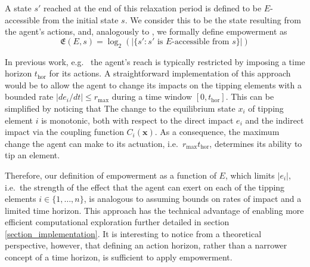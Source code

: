 \documentclass[conference]{IEEEtran}
\newcommand{\vectorsym}[1]{\ensuremath{\mathbf{#1}}}
\newcommand{\agentimpact}{\ensuremath{e}}
\newcommand{\empowerment}{\ensuremath{\mathfrak{E}}}
\newcommand{\couplingfunction}{\ensuremath{C}}
\newcommand{\impactstrength}{\ensuremath{E}}
\newcommand{\timehorizon}{\ensuremath{t_{\mathrm{hor}}}}
\begin{document}
A state $s'$ reached at the end of this relaxation period is defined
to be $\impactstrength$-accessible from the initial state $s$. We
consider this to be the state resulting from the agent's actions, and,
analogously to \cite[eq.~(2)]{Kim2009_sustainability}, we formally define
empowerment as
\begin{equation}
  \label{eq_empowerment}
  \empowerment(\impactstrength, s) =
  \log_2(|\{s': s' \mbox{ is } \impactstrength\mbox{-accessible from } s\}|)
\end{equation}

In previous work, e.g.\ \cite{Salge2014_empowermentintro} the agent's
reach is typically restricted by imposing a time horizon
$\timehorizon$ for its actions. A straightforward implementation of
this approach would be to allow the agent to change its impacts on the
tipping elements with a bounded rate
$|d\agentimpact_i / dt| \le r_{\mathrm{max}}$ during a time window
$[0, \timehorizon]$. This can be simplified by noticing that The
change to the equilibrium state $x_i$ of tipping element $i$ is
monotonic, both with respect to the direct impact $\agentimpact_i$ and
the indirect impact via the coupling function
$\couplingfunction_i(\vectorsym{x})$. As a consequence, the maximum
change the agent can make to its actuation, i.e.\
$r_{\mathrm{max}} \timehorizon$, determines its ability to tip an
element.

Therefore, our definition of empowerment as a function of
$\impactstrength$, which limits $|\agentimpact_i|$, i.e.\ the strength
of the effect that the agent can exert on each of the tipping elements
$i \in \{1, \ldots, n\}$, is analogous to assuming bounds on rates of
impact and a limited time horizon. This approach has the technical
advantage of enabling more efficient computational exploration further
detailed in section \ref{section_implementation}. It is interesting to
notice from a theoretical perspective, however, that defining an
action horizon, rather than a narrower concept of a time horizon, is
sufficient to apply empowerment.

\end{document}
